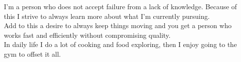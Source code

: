\documentclass[a4paper]{twentysecondcv} %
\begin{document}





{
\hspace{1em}
I'm a person who does not accept failure from a lack of knowledge. Because of this I strive to always learn more about what I'm currently pursuing.\\

Add to this a desire to always keep things moving and you get a person who works fast and efficiently without compromising quality.\\

In daily life I do a lot of cooking and food exploring, then I enjoy going to the gym to offset it all.}


    
    

\makeprofile %

\end{document}
